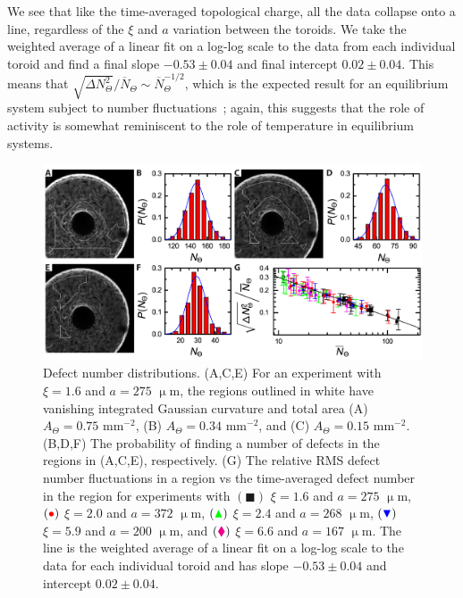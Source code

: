 We see that like the time-averaged topological charge, all the data collapse onto a line, regardless of the $\xi$ and $a$ variation between the toroids.
We take the weighted average of a linear fit on a log-log scale to the data from each individual toroid and find a final slope $-0.53 \pm 0.04$ and final intercept $0.02 \pm 0.04$.
This means that $\displaystyle{\sqrt{\Delta N_{\Theta}^2}} \bigg / \displaystyle {\overbar{N}_{\Theta}} \sim \overbar{N}_{\Theta}^{-1/2}$, which is the expected result for an equilibrium system subject to number fluctuations~\cite{RN311}; again, this suggests that the role of activity is somewhat reminiscent to the role of temperature in equilibrium systems.
\begin{figure}
  \centering
  \includegraphics{figures/C3/Ch3-Figs_ExpDistribution.png}
  \caption{Defect number distributions.
  (A,C,E) For an experiment with $\xi = 1.6$ and $a = 275$ $\upmu$m, the regions outlined in white have vanishing integrated Gaussian curvature and total area (A) $A_{\Theta} = 0.75$ mm$^{-2}$, (B) $A_{\Theta} = 0.34$ mm$^{-2}$, and (C) $A_{\Theta} = 0.15$ mm$^{-2}$.
  (B,D,F) The probability of finding a number of defects in the regions in (A,C,E), respectively.
  (G) The relative RMS defect number fluctuations in a region vs the time-averaged defect number in the region for experiments with
  $({\blacksquare})$ $\xi = 1.6 $ and $a = 275$ $\upmu$m,
  $({\color{red} \bullet})$ $\xi = 2.0 $ and $a = 372$ $\upmu$m,
  $({\color{green} \blacktriangle})$ $\xi = 2.4 $ and $a = 268$ $\upmu$m,
  $({\color{blue} \blacktriangledown})$ $\xi = 5.9$ and $a = 200$ $\upmu$m, and
  $({\color{magenta} \blacklozenge})$ $\xi = 6.6$ and $a = 167$ $\upmu$m.
  The line is the weighted average of a linear fit on a log-log scale to the data for each individual toroid and has slope $-0.53 \pm 0.04$ and intercept $0.02 \pm 0.04$.}\label{f:3-ExpDistribution}
\end{figure}



